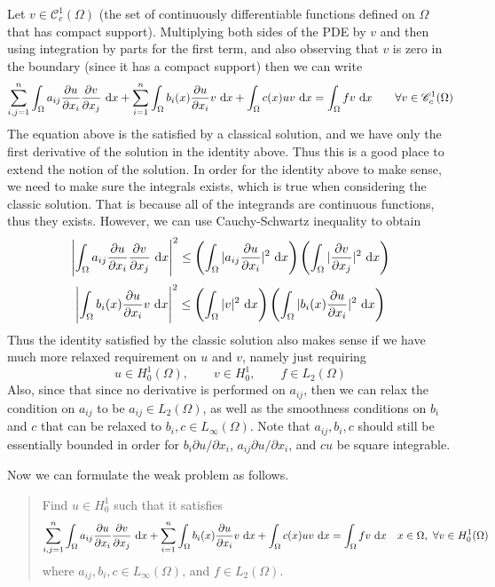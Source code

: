 Let $ v \in \mathscr{C}^1_c(\Omega) $ (the set of continuously differentiable functions defined on $ \Omega $ that has compact support). Multiplying both sides of the PDE by $ v $  and then using integration by parts for the first term, and also observing that $ v $ is zero in the boundary (since it has a compact support) then we can write
\[ \sum_{i,j=1}^{n}\int_\Omega a_{ij}\frac{\partial u}{\partial x_i} \frac{\partial v}{\partial x_j}\, \operatorname{d}\!x +\sum_{i=1}^{n} \int_\Omega b_i(x)\frac{\partial u}{\partial x_i} v\, \operatorname{d}\!x + \int_\Omega c(x) u v\, \operatorname{d}\!x = \int_\Omega fv\, \operatorname{d}\!x \qquad \forall v \in \mathscr{C}^1_c(\Omega) \]
The equation above is the satisfied by a classical solution, and we have only the first derivative of the solution in the identity above. Thus this is a good place to extend the notion of the solution. In order for the identity above to make sense, we need to make sure the integrals exists, which is true when considering the classic solution. That is because all of the integrands are continuous functions, thus they exists. However, we can use Cauchy-Schwartz inequality to obtain
\[\left|  \int_\Omega a_{ij}\frac{\partial u}{\partial x_i} \frac{\partial v}{\partial x_j}\, \operatorname{d}\!x  \right|^2 \leq \left(\int_\Omega |a_{ij}\frac{\partial u}{\partial x_i}|^2\, \operatorname{d}\!x\right)\left(\int_\Omega |\frac{\partial v}{\partial x_j}|^2\, \operatorname{d}\!x\right)\]
\[ \left| \int_\Omega b_i(x)\frac{\partial u}{\partial x_i} v \, \operatorname{d}\!x \right|^2 \leq \left(\int_\Omega |v|^2\, \operatorname{d}\!x\right)\left(\int_\Omega |b_i(x)\frac{\partial u}{\partial x_i}|^2 \, \operatorname{d}\!x\right) \]
Thus the identity satisfied by the classic solution also makes sense if we have much more relaxed requirement on $ u $ and $ v $, namely just requiring
\[ u \in H^1_0 (\Omega), \qquad v \in H^1_0, \qquad f \in L_2(\Omega) \]
Also, since that since no derivative is performed on $ a_{ij} $, then we can relax the condition on $ a_{ij} $ to be $ a_{ij} \in L_2(\Omega) $, as well as the smoothness conditions on $ b_i $ and $ c $ that can be relaxed to $ b_i, c \in L_\infty(\Omega) $. Note that $ a_{ij},b_i,c $ should still be essentially bounded in order for $ b_i \partial u/\partial x_i $, $ a_{ij}\partial u/\partial x_i $, and $ c u $ be square integrable.

Now we can formulate the weak problem as follows.
\begin{quote}
	Find $ u \in H_0^1 $ such that it satisfies
	\begin{align*}
		\sum_{i,j=1}^{n}\int_\Omega a_{ij}\frac{\partial u}{\partial x_i} \frac{\partial v}{\partial x_j}\, \operatorname{d}\!x +\sum_{i=1}^{n} \int_\Omega b_i(x) \frac{\partial u}{\partial x_i} v\, \operatorname{d}\!x + \int_\Omega c(x) u v\, \operatorname{d}\!x = \int_\Omega fv\, \operatorname{d}\!x \quad x\in \Omega,\ \forall v \in H_0^1(\Omega) 
	\end{align*}
	where $ a_{ij}, b_i, c \in L_\infty(\Omega) $, and $ f \in L_2(\Omega) $.
\end{quote}

